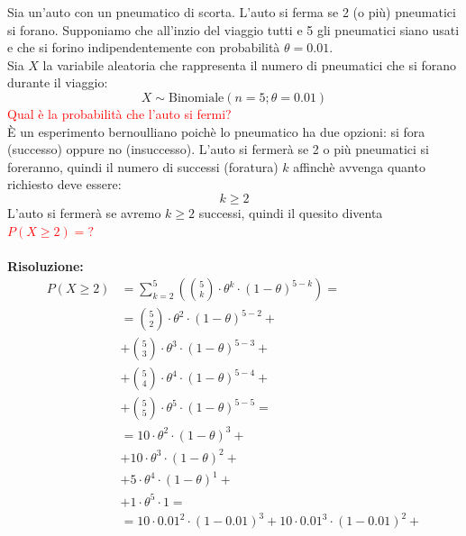 \documentclass{article}  %
\theoremstyle{definition}
\begin{document}
\begin{esercizio}[Esercizio]
	Sia un'auto con un pneumatico di scorta. L'auto si ferma se 2 (o più) pneumatici si forano. Supponiamo che all'inzio del viaggio tutti e 5 gli pneumatici
	siano usati e che si forino indipendentemente con probabilità $\theta=0.01$. \\
	Sia $X$ la variabile aleatoria che rappresenta il numero di pneumatici che si forano durante il viaggio:
	\[
		X \sim \text{Binomiale}(n=5;\theta=0.01)
	\]
	\textcolor{red}{Qual è la probabilità che l'auto si fermi?} \\
	È un esperimento bernoulliano poichè lo pneumatico ha due opzioni: si fora (successo) oppure no (insuccesso).
	L'auto si fermerà se 2 o più pneumatici si foreranno, quindi il numero di successi (foratura) $k$ affinchè avvenga quanto richiesto deve essere:
	\[
		k \geq 2
	\]
	L'auto si fermerà se avremo $ k \geq 2$ successi, quindi il quesito diventa \textcolor{red}{$P(X \geq 2)=?$} \\ \\
	\textbf{Risoluzione:}
	\begin{align*}
		P(X \geq 2)
		 & = \sum_{k=2}^{5}\left(\binom{5}{k}\cdot \theta^k \cdot (1-\theta)^{5-k}\right) =                     \\
		 & = \binom{5}{2} \cdot \theta^2 \cdot (1-\theta)^{5-2} +                                               \\
		 & + \binom{5}{3} \cdot \theta^3 \cdot (1-\theta)^{5-3} +                                               \\
		 & + \binom{5}{4} \cdot \theta^4 \cdot (1-\theta)^{5-4} +                                               \\
		 & + \binom{5}{5} \cdot \theta^5 \cdot (1-\theta)^{5-5} =                                               \\
		 & = 10 \cdot \theta^2 \cdot (1-\theta)^{3} +                                                           \\
		 & + 10 \cdot \theta^3 \cdot (1-\theta)^{2} +                                                           \\
		 & + 5 \cdot \theta^4 \cdot (1-\theta)^{1} +                                                            \\
		 & + 1 \cdot \theta^5 \cdot 1 =                                                                         \\
		 & = 10 \cdot 0.01^2 \cdot (1-0.01)^{3} + 10 \cdot 0.01^3 \cdot (1-0.01)^{2} +                          \\

\end{align*}
\end{esercizio}
\end{document}
